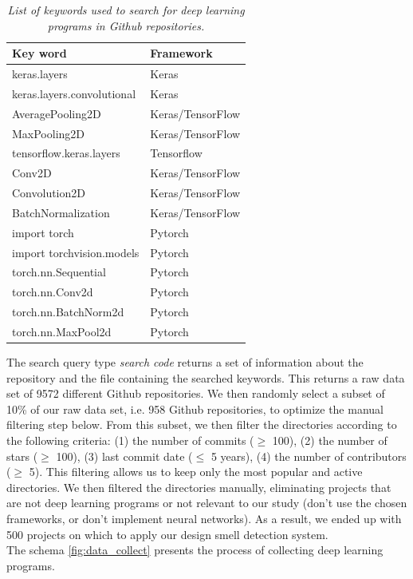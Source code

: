 \begin{table}[h]
  \centering
  \caption{\emph{List of keywords used to search for deep learning programs in Github repositories.}}
  \label{tab:keywords}
  \begin{tabular}{ll}
    \toprule
    \textbf{Key word}          & \textbf{Framework} \\ \midrule
    keras.layers               & Keras              \\
    keras.layers.convolutional & Keras              \\
    AveragePooling2D           & Keras/TensorFlow   \\
    MaxPooling2D               & Keras/TensorFlow   \\
    tensorflow.keras.layers    & Tensorflow         \\
    Conv2D                     & Keras/TensorFlow   \\
    Convolution2D              & Keras/TensorFlow   \\
    BatchNormalization         & Keras/TensorFlow   \\
    import torch               & Pytorch            \\
    import torchvision.models  & Pytorch            \\
    torch.nn.Sequential        & Pytorch            \\
    torch.nn.Conv2d            & Pytorch            \\
    torch.nn.BatchNorm2d       & Pytorch            \\
    torch.nn.MaxPool2d         & Pytorch            \\ \bottomrule
  \end{tabular}
\end{table}


The search query type \emph{search code} returns a set of information about the
repository and the file containing the searched keywords. This returns a raw
data set of 9572 different Github repositories. We then randomly select a subset
of 10\% of our raw data set, i.e. 958 Github repositories, to optimize
the manual filtering step below. From this subset, we then filter the
directories according to the following criteria:
(1) the number of commits ($\geq$ 100), (2) the number of stars ($\geq$ 100),
(3) last commit date ($\leq$ 5 years), (4) the number of contributors ($\geq$
5). This filtering allows us to keep only the most popular and active
directories. We then filtered the directories manually, eliminating projects
that are not deep learning programs or not relevant to our study (don't use the
chosen frameworks, or don't implement neural networks). As a result, we ended up
with 500 projects on which to apply our design smell detection system. \\The
schema \ref{fig:data_collect} presents the process of collecting deep learning
programs.\\

